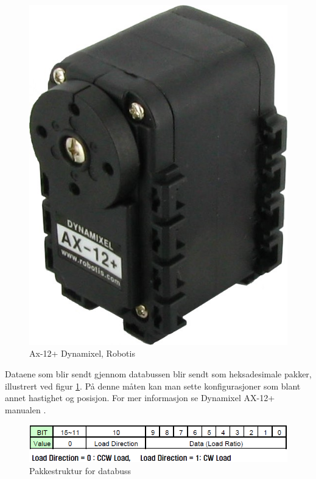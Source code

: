 \documentclass[12pt]{report}
\begin{document}
\begin{figure}[h!]
	\includegraphics[scale=0.3]{imgs/servo_ax12-5}
	\centering
	\caption{Ax-12+ Dynamixel, Robotis}
\end{figure}

Dataene som blir sendt gjennom databussen blir sendt som heksadesimale pakker, illustrert ved figur \ref{pkg}. På denne måten kan man sette konfigurasjoner som blant annet hastighet og posisjon. For mer informasjon se Dynamixel AX-12+ manualen \cite{Dynamixel}.

\begin{figure}[h!]
	\includegraphics[scale=0.5]{imgs/dxl_presentload}
	\centering
	\caption{Pakkestruktur for databuss}	
	\label{pkg}
\end{figure}
\end{document}
